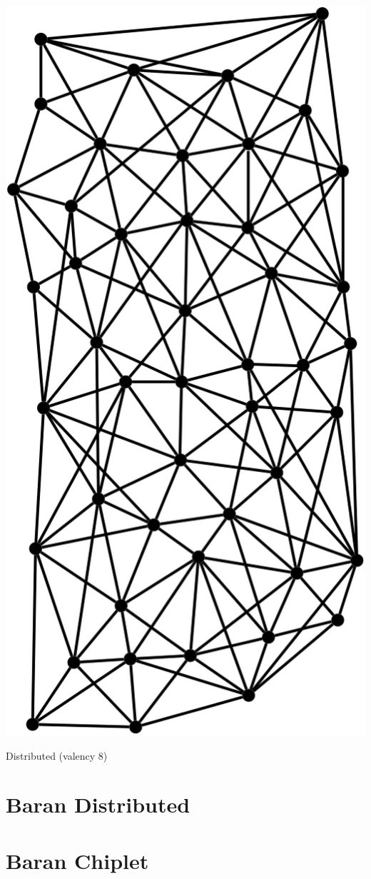 \documentclass[../HFT-main.tex]{subfiles}
\begin{document}
\begin{marginfigure}
  \includegraphics[width=0.6\linewidth]{../figures/Baran-valency-8.png}
  \caption{Distributed (valency 8)}
    \vspace{20pt}
\end{marginfigure}

  
\section{Baran Distributed}

\section{Baran Chiplet}
\end{document}
